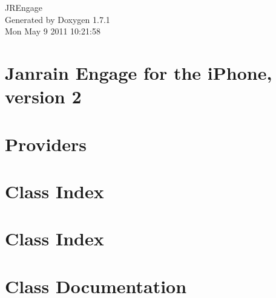 \documentclass[a4paper]{book}
\begin{document}
\hypersetup{pageanchor=false}
\begin{titlepage}
\vspace*{7cm}
\begin{center}
{\Large JREngage }\\
\vspace*{1cm}
{\large Generated by Doxygen 1.7.1}\\
\vspace*{0.5cm}
{\small Mon May 9 2011 10:21:58}\\
\end{center}
\end{titlepage}
\clearemptydoublepage
{}
\tableofcontents
\clearemptydoublepage
{}
\hypersetup{pageanchor=true}
\chapter{Janrain Engage for the iPhone, version 2}
\label{index}\hypertarget{index}{}
\chapter{Providers}
\label{Providers}
\hypertarget{Providers}{}

\chapter{Class Index}

\chapter{Class Index}

\chapter{Class Documentation}



















\printindex
\end{document}
